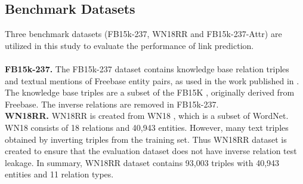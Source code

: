 \documentclass[letterpaper]{article} \usepackage{aaai19}  \usepackage{times}  \usepackage{helvet}  \usepackage{courier}  \usepackage{url}  \usepackage{graphicx}  \usepackage{amsmath}
\begin{document}
\subsection{Benchmark Datasets}
Three benchmark datasets (FB15k-237, WN18RR and FB15k-237-Attr) are utilized in this study to evaluate the performance of link prediction.\\
\\
\textbf{FB15k-237.}
The FB15k-237 \cite{toutanova2015observed} dataset contains knowledge base relation triples and textual mentions of Freebase entity pairs, as used in the work published in \cite{toutanova2015observed}. The knowledge base triples are a subset of the FB15K \cite{bordes2013translating}, originally derived from Freebase. The inverse relations are removed in FB15k-237.\\
\textbf{WN18RR.}
WN18RR \cite{dettmers2017conve} is created from WN18 \cite{bordes2013translating}, which is a subset of WordNet. WN18 consists of 18 relations and 40,943 entities. However, many text triples obtained by inverting triples from the training set.
Thus WN18RR dataset \cite{dettmers2017conve} is created to ensure that the evaluation dataset does not have inverse relation test leakage. In summary, WN18RR dataset contains 93,003 triples with 40,943 entities and 11 relation types.
\end{document}

